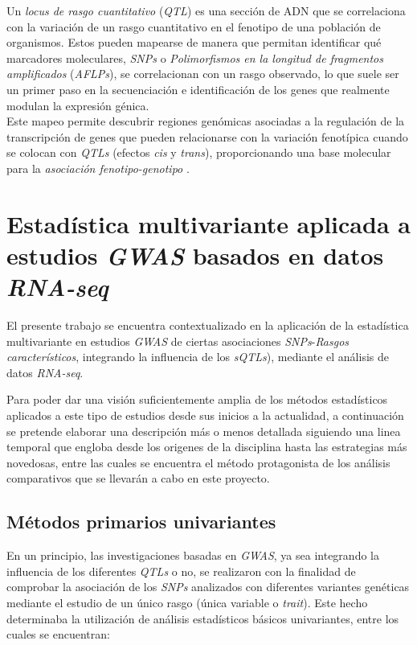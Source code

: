 \documentclass[IB,BIB]{TFUOC}%
\begin{document}
Un \textit{locus de rasgo cuantitativo} (\textit{QTL}) es una sección de ADN que se correlaciona con la variación de un rasgo cuantitativo en el fenotipo de una población de organismos. Estos pueden mapearse de manera que permitan identificar qué marcadores moleculares, \textit{SNPs} o \textit{Polimorfismos en la longitud de fragmentos amplificados} (\textit{AFLPs}), se correlacionan con un rasgo observado, lo que suele ser un primer paso en la secuenciación e identificación de los genes que realmente modulan la expresión génica. \\
Este mapeo permite descubrir regiones genómicas asociadas a la regulación de la transcripción de genes que pueden relacionarse con la variación fenotípica cuando se colocan con \textit{QTLs} (efectos \textit{cis} y \textit{trans}), proporcionando una base molecular para la \textit{asociación fenotipo-genotipo} \cite{noauthor_quantitative_2023, takata_genome-wide_2017, zhang_identification_2015}.


\section{Estadística multivariante aplicada a estudios \textit{GWAS} basados en datos \textit{RNA-seq}}
\label{sec:Estadística multivariante aplicada a estudios GWAS basados en datos RNA-seq}

El presente trabajo se encuentra contextualizado en la aplicación de la estadística multivariante en estudios \textit{GWAS} de ciertas asociaciones \textit{SNPs}-\textit{Rasgos característicos}, integrando la influencia de los \textit{sQTLs}), mediante el análisis de datos \textit{RNA-seq}.

Para poder dar una visión suficientemente amplia de los métodos estadísticos aplicados a este tipo de estudios desde sus inicios a la actualidad, a continuación se pretende elaborar una descripción más o menos detallada siguiendo una linea temporal que engloba desde los origenes de la disciplina hasta las estrategias más novedosas, entre las cuales se encuentra el método protagonista de los análisis comparativos que se llevarán a cabo en este proyecto.


\subsection{Métodos primarios univariantes}
\label{sec:Métodos primarios univariantes}

En un principio, las investigaciones basadas en \textit{GWAS}, ya sea integrando la influencia de los diferentes \textit{QTLs} o no, se realizaron con la finalidad de comprobar la asociación de los \textit{SNPs} analizados con diferentes variantes genéticas mediante el estudio de un único rasgo (única variable o \textit{trait}). Este hecho determinaba la utilización de análisis estadísticos básicos univariantes, entre los cuales se encuentran:
\end{document}
